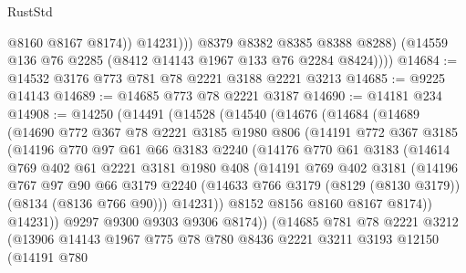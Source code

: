 \begin{lexlean}{RustStd}
\begin{coremodule}
{\begin{coremodule}
{{{{{{{{{{{{{{{{{{{{{{{{{{{{{{{{{{{{{{{{{{{{{{{{{{{{{                    @8160
                    @8167
                    @8174))
                @14231)))
          @8379
          @8382
          @8385
          @8388
          @8288)
        (@14559 @136 @76 @2285 (@8412 @14143 @1967 @133 @76 @2284 @8424))))
@14684 := @14532 @3176 @773 @781 @78 @2221 @3188 @2221 @3213
@14685 := @9225 @14143
@14689 := @14685 @773 @78 @2221 @3187
@14690 := @14181 @234
@14908 := @14250
    (@14491
      (@14528
        (@14540
          (@14676
            (@14684
              (@14689
                (@14690
                  @772
                  @367
                  @78
                  @2221
                  @3185
                  @1980
                  @806
                  (@14191
                    @772
                    @367
                    @3185
                    (@14196
                      @770
                      @97
                      @61
                      @66
                      @3183
                      @2240
                      (@14176
                        @770
                        @61
                        @3183
                        (@14614
                          @769
                          @402
                          @61
                          @2221
                          @3181
                          @1980
                          @408
                          (@14191
                            @769
                            @402
                            @3181
                            (@14196
                              @767
                              @97
                              @90
                              @66
                              @3179
                              @2240
                              (@14633 @766 @3179 (@8129 (@8130 @3179)) (@8134 (@8136 @766 @90)))
                              @14231))
                          @8152
                          @8156
                          @8160
                          @8167
                          @8174))
                      @14231))
                  @9297
                  @9300
                  @9303
                  @9306
                  @8174))
              (@14685
                @781
                @78
                @2221
                @3212
                (@13906
                  @14143
                  @1967
                  @775
                  @78
                  @780
                  @8436
                  @2221
                  @3211
                  @3193
                  @12150
                  (@14191
                    @780
}}}}}}}}}}}}}}}}}}}}}}}}}}}}}}}}}}}}}}}}}}}}}}}}}}}}}
\end{coremodule}}
\end{coremodule}
\end{lexlean}
